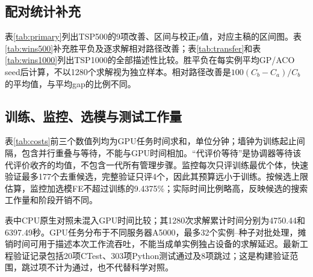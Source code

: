 \documentclass[runningheads,orivec]{llncs}
\begin{document}
\subsection{配对统计补充}
表\ref{tab:primary}列出TSP500的9项改善、区间与校正$p$值，对应主稿的区间图。表\ref{tab:wins500}补充胜平负及逐求解相对路径改善；表\ref{tab:transfer}和表\ref{tab:wins1000}列出TSP1000的全部描述性比较。胜平负在每实例平均GP/ACO seed后计算，不以1280个求解视为独立样本。相对路径改善是$100(C_b-C_a)/C_b$的平均值，与平均gap的比例不同。
\begin{table}[htbp]\caption{TSP500完整配对比较，$\Delta$及区间单位为百分点；$p_H$在9项主检验中共同Holm校正。}\label{tab:primary}
\centering\small{}\end{table}
\begin{table}[htbp]\caption{TSP500胜平负与相对路径长度改善。}\label{tab:wins500}
\centering\small{}\end{table}
\begin{table}[htbp]\caption{TSP1000完整描述性比较，单位为百分点；不进行额外主检验，$p_H$留空。}\label{tab:transfer}
\centering\small{}\end{table}
\begin{table}[htbp]\caption{TSP1000胜平负与相对路径长度改善。}\label{tab:wins1000}
\centering\small{}\end{table}

\subsection{训练、监控、选模与测试工作量}
表\ref{tab:costs}前三个数值列均为GPU任务时间求和，单位分钟；墙钟为训练起止间隔，包含并行重叠与等待，不能与GPU时间相加。“代评价等待”是协调器等待该代评价收齐的均值，不包含一代所有管理步骤。监控每次只评训练最优个体，快速验证最多177个去重候选，完整验证只评4个，因此其预算远小于训练。按候选上限估算，监控加选模FE不超过训练的9.4375\%；实际时间比例略高，反映候选的搜索工作量和阶段开销不同。
\begin{table}[htbp]\caption{正式轮次每次运行的成本。训练、监控、选模单位为GPU分钟。}\label{tab:costs}
\centering\small{}\end{table}
\begin{table}[htbp]\caption{TSP500测试吞吐及每FE搜索工作。总摊销秒为1280次求解的批处理时间分摊之和。}\label{tab:testcost500}
\centering\small{}\end{table}
\begin{table}[htbp]\caption{TSP1000测试吞吐及每FE搜索工作，口径同上。}\label{tab:testcost1000}
\centering\small{}\end{table}
表中CPU原生对照未混入GPU时间比较；其1280次求解累计时间分别为4750.44和6397.49秒。GPU任务分布于不同服务器A5000，最多32个实例--种子对批处理，摊销时间可用于描述本次工作流吞吐，不能当成单实例独占设备的求解延迟。最新工程验证记录包括20项CTest、303项Python测试通过及8项跳过；这是构建验证范围，跳过项不计为通过，也不代替科学对照。
\end{document}
